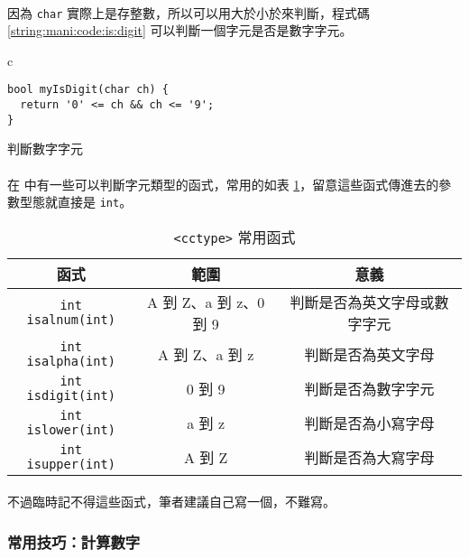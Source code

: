 \documentclass[12pt,a4paper,oneside]{report}
\begin{document}
\begin{CJK}{UTF8}{bkai}
\paragraph{}因為 \lstinline!char! 實際上是存整數，所以可以用大於小於來判斷，程式碼 \ref{string:mani:code:is:digit} 可以判斷一個字元是否是數字字元。
\begin{code}[h!]
  \centering
  \begin{tabular}{c}
  \begin{lstlisting}
bool myIsDigit(char ch) {
  return '0' <= ch && ch <= '9';
}
  \end{lstlisting}
  \end{tabular}
  \caption{判斷數字字元}
  \label{string:mani:code:is:digit}
\end{code}

\paragraph{}在  中有一些可以判斷字元類型的函式，常用的如表 \ref{string:mani:table:cctype}，留意這些函式傳進去的參數型態就直接是 \lstinline!int!。

\begin{table}[h!]
  \centering
  \begin{tabular}{|c|c|c|}
  \hline
  \textbf{函式} & \textbf{範圍} & \textbf{意義}\\
  \hline\hline
  \lstinline!int isalnum(int)! & A 到 Z、a 到 z、0 到 9 & 判斷是否為英文字母或數字字元\\
  \hline
  \lstinline!int isalpha(int)! & A 到 Z、a 到 z & 判斷是否為英文字母\\
  \hline
  \lstinline!int isdigit(int)! & 0 到 9 & 判斷是否為數字字元\\
  \hline
  \lstinline!int islower(int)! & a 到 z & 判斷是否為小寫字母\\
  \hline
  \lstinline!int isupper(int)! & A 到 Z & 判斷是否為大寫字母\\
  \hline
  \end{tabular}
  \caption{\lstinline!<cctype>! 常用函式}
  \label{string:mani:table:cctype}
\end{table}

\paragraph{}不過臨時記不得這些函式，筆者建議自己寫一個，不難寫。

\subsubsection{常用技巧：計算數字}


\end{CJK}
\end{document}
